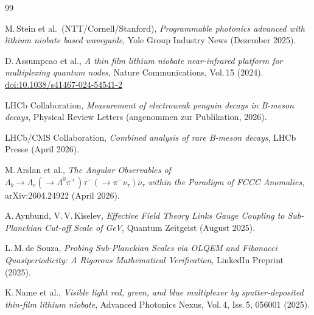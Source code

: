 \begin{thebibliography}{99}

M.\,Stein et al.\ (NTT/Cornell/Stanford),
\textit{Programmable photonics advanced with lithium niobate based waveguide},
Yole Group Industry News (Dezember 2025).

D.\,Assumpcao et al.,
\textit{A thin film lithium niobate near-infrared platform for multiplexing quantum nodes},
Nature Communications, Vol.\,15 (2024).
\href{https://doi.org/10.1038/s41467-024-54541-2}{doi:10.1038/s41467-024-54541-2}

LHCb Collaboration,
\textit{Measurement of electroweak penguin decays in B-meson decays},
Physical Review Letters (angenommen zur Publikation, 2026).

LHCb/CMS Collaboration,
\textit{Combined analysis of rare B-meson decays},
LHCb Presse (April 2026).

M.\,Arslan et al.,
\textit{The Angular Observables of $\Lambda_b \to \Lambda_c(\to \Lambda^0\pi^+)
\tau^-(\to\pi^-\nu_\tau)\bar{\nu}_\tau$ within the Paradigm of FCCC Anomalies},
arXiv:2604.24922 (April 2026).

A.\,Aynbund, V.\,V.\,Kiselev,
\textit{Effective Field Theory Links Gauge Coupling to Sub-Planckian Cut-off Scale of GeV},
Quantum Zeitgeist (August 2025).

L.\,M.\,de Souza,
\textit{Probing Sub-Planckian Scales via OLQEM and Fibonacci Quasiperiodicity:
A Rigorous Mathematical Verification},
LinkedIn Preprint (2025).

K.\,Name et al.,
\textit{Visible light red, green, and blue multiplexer by sputter-deposited
thin-film lithium niobate},
Advanced Photonics Nexus, Vol.\,4, Iss.\,5, 056001 (2025).

\end{thebibliography}
